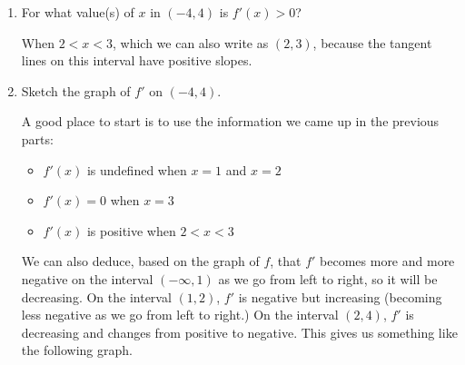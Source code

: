 \documentclass{article}
\begin{document}
\begin{enumerate}[resume]
\begin{enumerate}
  \item
    \begin{problem}[\vfill]
      For what value(s) of $x$ in $(-4, 4)$ is $f'(x) > 0$?
    \end{problem}

    \begin{solution}
      When $2 < x < 3$, which we can also write as $(2, 3)$, because the tangent lines on this interval have positive slopes.
    \end{solution}

  \item
    \begin{problem}[\nstretch{6}]
      Sketch the graph of $f'$ on $(-4, 4)$. 
    \end{problem}

    \begin{solution}
    A good place to start is to use the information we came up in the previous parts:
    \begin{itemize}
      \item $f'(x)$ is undefined when $x=1$ and $x=2$
      \item $f'(x)=0$ when $x=3$
      \item $f'(x)$ is positive when $2 < x < 3$
    \end{itemize}
    We can also deduce, based on the graph of $f$, that $f'$ becomes more and more negative on the interval
    $(-\infty, 1)$ as we go from left to right, so it will be decreasing. On the interval $(1, 2)$, $f'$ is negative
    but increasing (becoming less negative as we go from left to right.) On the interval $(2, 4)$, $f'$ is decreasing and
    changes from positive to negative. This gives us something like the following graph.
    
    \end{solution}
  \end{enumerate}



\end{enumerate}
\end{document}
